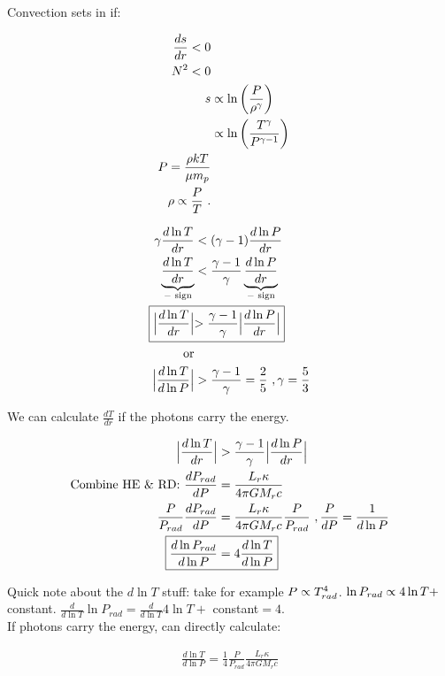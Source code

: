 Convection sets in if:

\begin{align}
\frac{ds}{dr} < 0\\
N^2 < 0\\
s &\propto \ln \left( \frac{P}{\rho^\gamma} \right)\\
 &\propto \ln \left( \frac{T^\gamma}{P^{\gamma -1}} \right)\\
P = \frac{\rho kT}{\mu m_p}\\
\rho \propto \frac{P}{T}~.
\end{align}

\begin{align}
\gamma \frac{d \ln T}{dr} &< ( \gamma - 1) \frac{d \ln P}{dr}\\
\underbrace{\frac{d \ln T}{dr}}_{\text{$-$ sign}} &< \frac{\gamma -1}{\gamma}\underbrace{\frac{d \ln P}{dr}}_{\text{$-$ sign}}\\
\Aboxed{\Bigl\lvert \frac{d \ln T}{dr} \Bigl\lvert &> \frac{\gamma -1}{\gamma} \Bigl\lvert \frac{d \ln P}{dr} \Bigl\lvert} \\
\text{or}\\
\Bigl\lvert \frac{d \ln T}{d \ln P	} \Bigl\lvert &> \frac{\gamma - 1}{\gamma} = \frac{2}{5}~,\gamma = \frac{5}{3}
\end{align}

We can calculate $\frac{dT}{dr}$ if the photons carry the energy.

\begin{align}
\Bigl\lvert \frac{d \ln T}{dr} \Bigl\lvert &> \frac{\gamma -1}{\gamma} \Bigl\lvert \frac{d \ln P}{dr} \Bigl\lvert\\
\text{Combine HE \& RD: } \frac{dP_{rad}}{dP} &= \frac{L_r \kappa}{4 \pi GM_r c}\\
\frac{P}{P_{rad}}\frac{dP_{rad}}{dP} &= \frac{L_r \kappa}{4 \pi GM_r c}\frac{P}{P_{rad}}~,\frac{P}{dP} = \frac{1}{d \ln P}\\
\Aboxed{\frac{d \ln P_{rad}}{d \ln P} &=4 \frac{d \ln T}{d \ln P}}
\end{align}

Quick note about the $d \ln T$ stuff: take for example $P\propto T_{rad}^4$. $\ln P_{rad} \propto 4 \ln T +$ constant. $\frac{d}{d \ln T} \ln P_{rad} = \frac{d}{d \ln T}4 \ln T +$ constant$= 4$.\\
If photons carry the energy, can directly calculate: 

\begin{align}
\boxed{\frac{d \ln T}{d \ln P} = \frac{1}{4} \frac{P}{P_{rad}} \frac{L_r \kappa}{4 \pi GM_rc}}
\end{align}

